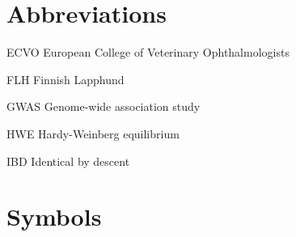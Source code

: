 \documentclass[12pt, a4paper, oneside]{article}
\begin{document}

\doublespacing

\tableofcontents

\clearpage

\listoffigures
\listoftables


\clearpage


\onehalfspacing

{}

\section*{Abbreviations} \label{sec:abbreviations}


\begin{abbreviations}
    \item [ECVO]         European College of Veterinary Ophthalmologists
    \item [FLH]          Finnish Lapphund
    \item [GWAS]         Genome-wide association study
    \item [HWE]          Hardy-Weinberg equilibrium
    \item [IBD]          Identical by descent
\end{abbreviations}

\section*{Symbols}
\end{document}
